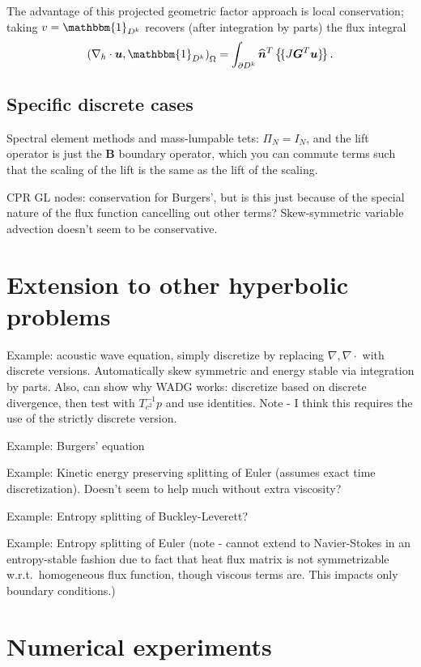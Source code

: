 \documentclass[preprint,10pt]{article}
\theoremstyle{definition}
\theoremstyle{lemma}
\newcommand{\bbm}[1]{\mathbbm{#1}}
\newcommand{\LRp}[1]{\left( #1 \right)}
\newcommand{\LRc}[1]{\left\{ #1 \right\}}
\newcommand{\Grad} {\ensuremath{\nabla}}
\newcommand{\avg}[1] {\ensuremath{\LRc{\!\{#1\}\!}}}
\begin{document}
The advantage of this projected geometric factor approach is local conservation; taking $v = \bbm{1}_{D^k}$ recovers (after integration by parts) the flux integral
\[
\LRp{\Grad_h \cdot \bm{u},\bbm{1}_{D^k}}_{\Omega} = \int_{\partial D^k}\widehat{\bm{n}}^T\avg{J\bm{G}^T\bm{u}}.
\]

\subsection{Specific discrete cases}

Spectral element methods and mass-lumpable tets: $\Pi_N = I_N$, and the lift operator is just the $\bm{B}$ boundary operator, which you can commute terms such that the scaling of the lift is the same as the lift of the scaling.  

CPR GL nodes: conservation for Burgers', but is this just because of the special nature of the flux function cancelling out other terms?  Skew-symmetric variable advection doesn't seem to be conservative.

\section{Extension to other hyperbolic problems}

Example: acoustic wave equation, simply discretize by replacing $\Grad, \Grad\cdot$ with discrete versions.  Automatically skew symmetric and energy stable via integration by parts.  Also, can show why WADG works: discretize based on discrete divergence, then test with $T_{c^2}^{-1}p$ and use identities.  Note - I think this requires the use of the strictly discrete version.  

Example: Burgers' equation

Example: Kinetic energy preserving splitting of Euler (assumes exact time discretization).  Doesn't seem to help much without extra viscosity?  

Example: Entropy splitting of Buckley-Leverett?

Example: Entropy splitting of Euler (note - cannot extend to Navier-Stokes in an entropy-stable fashion due to fact that heat flux matrix is not symmetrizable w.r.t.\ homogeneous flux function, though viscous terms are.  This impacts only boundary conditions.) 

\section{Numerical experiments}
\end{document}
